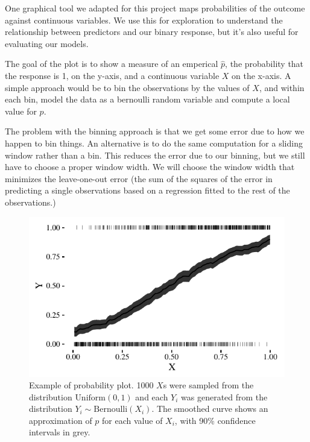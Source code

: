 \documentclass[12pt,twoside]{reedthesis}
\begin{document}
  One graphical tool we adapted for this project maps probabilities of the
  outcome against continuous variables. We use this for exploration to
  understand the relationship between predictors and our binary response,
  but it's also useful for evaluating our models.
  
  The goal of the plot is to show a measure of an emperical \(\hat{p}\),
  the probability that the response is 1, on the y-axis, and a continuous
  variable \(X\) on the x-axis. A simple approach would be to bin the
  observations by the values of \(X\), and within each bin, model the data
  as a bernoulli random variable and compute a local value for \(p\).
  
  The problem with the binning approach is that we get some error due to
  how we happen to bin things. An alternative is to do the same
  computation for a sliding window rather than a bin. This reduces the
  error due to our binning, but we still have to choose a proper window
  width. We will choose the window width that minimizes the leave-one-out
  error (the sum of the squares of the error in predicting a single
  observations based on a regression fitted to the rest of the
  observations.)
  
  \begin{figure}[tbh]
  \centering
  \includegraphics[angle = 0,scale = 1]{figure/prob_plot_example.pdf}
  \caption[Example of probability plot. 1000 $X$s were sampled from the distribution
  $\text{Uniform}(0,1)$ and each $Y_i$ was generated from the distribution
  $Y_i \sim \text{Bernoulli}(X_i)$. The smoothed curve shows an approximation of $p$
  for each value of $X_i$, with 90\% confidence intervals in grey.]{\normalsize{Example of probability plot. 1000 $X$s were sampled from the distribution
  $\text{Uniform}(0,1)$ and each $Y_i$ was generated from the distribution
  $Y_i \sim \text{Bernoulli}(X_i)$. The smoothed curve shows an approximation of $p$
  for each value of $X_i$, with 90\% confidence intervals in grey.}}
  \label{fig:prob-plot-example}
  \end{figure}
  
\end{document}
